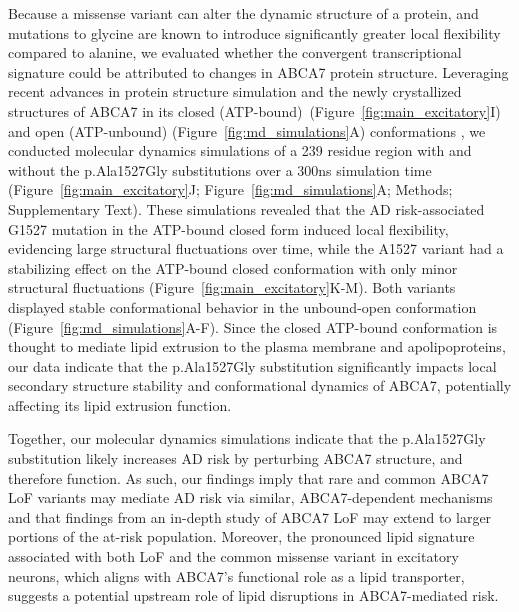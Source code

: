 Because a missense variant can alter the dynamic structure of a protein, and mutations to glycine are known to introduce significantly greater local flexibility compared to alanine, we evaluated whether the convergent transcriptional signature could be attributed to changes in ABCA7 protein structure. Leveraging recent advances in protein structure simulation and the newly crystallized structures of ABCA7 in its closed (ATP-bound)  (Figure~\ref{fig:main_excitatory}I) and open (ATP-unbound) (Figure~\ref{fig:md_simulations}A) conformations\cite{Le_Thi_My2022-dp,Jumper2021-na} , we conducted molecular dynamics simulations of a 239 residue region with and without the p.Ala1527Gly substitutions over a 300ns simulation time (Figure~\ref{fig:main_excitatory}J; Figure~\ref{fig:md_simulations}A; Methods; Supplementary Text). These simulations revealed that the AD risk-associated G1527 mutation in the ATP-bound closed form induced local flexibility, evidencing large structural fluctuations over time, while the A1527 variant had a stabilizing effect on the ATP-bound closed conformation with only minor structural fluctuations (Figure~\ref{fig:main_excitatory}K-M). Both variants displayed stable conformational behavior in the unbound-open conformation (Figure~\ref{fig:md_simulations}A-F). Since the closed ATP-bound conformation is thought to mediate lipid extrusion to the plasma membrane and apolipoproteins\cite{Le_Thi_My2022-dp}, our data indicate that the p.Ala1527Gly substitution significantly impacts local secondary structure  stability and conformational dynamics of ABCA7, potentially affecting its lipid extrusion function.  

Together, our molecular dynamics simulations indicate that the p.Ala1527Gly substitution likely increases AD risk by perturbing ABCA7 structure, and therefore function. As such, our findings imply that rare and common ABCA7 LoF variants may mediate AD risk via similar, ABCA7-dependent mechanisms  and that findings from an in-depth study of ABCA7 LoF may extend to larger portions of the at-risk population. Moreover, the pronounced lipid signature associated with both LoF and the common missense variant in excitatory neurons, which aligns with ABCA7's functional role as a lipid transporter, suggests a potential upstream role of lipid disruptions in ABCA7-mediated risk.  


